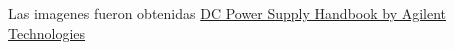 Las imagenes fueron obtenidas \href{https://ia600205.us.archive.org/22/items/DC_Power_Supply_Handbook_Agilent_Technologies_Application_Note_90B/DC_Power_Supply_Handbook_Agilent_Technologies_Application_Note_90B.pdf}{DC Power Supply Handbook by Agilent Technologies}






